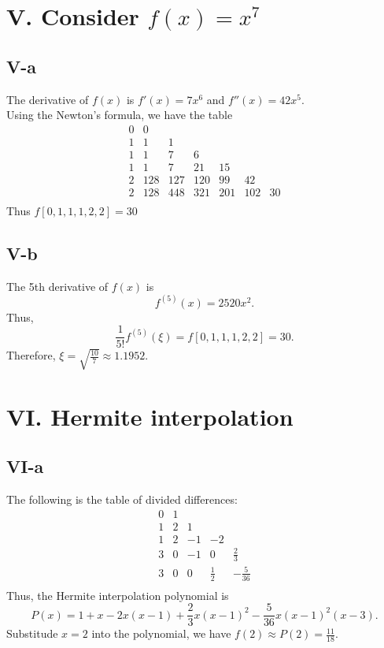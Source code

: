 \documentclass[a4paper]{article}
\begin{document}
\section*{V. Consider $f(x) = x^7$}
\subsection*{V-a}
The derivative of $f(x)$ is $f'(x) = 7x^6$ and $f''(x) = 42x^5$.\\
Using the Newton's formula, we have the table
\[
\begin{array}{c|cccccc}
    0 & 0 &  &  & && \\
    1 & 1 & 1 &  & && \\
    1 & 1 & 7 & 6 &  &&\\
    1 & 1 & 7 & 21 & 15&& \\
    2 & 128 & 127 & 120 & 99 &42&\\
    2 & 128 & 448 & 321 & 201 &102&30\\
\end{array}
\]
Thus $f[0,1,1,1,2,2] = 30$

\subsection*{V-b}
The 5th derivative of $f(x)$ is \[f^{(5)}(x) = 2520x^2.\]
Thus,\[
\frac{1}{5!}f^{(5)}(\xi) = f[0,1,1,1,2,2] = 30.
\]
Therefore, $\xi = \sqrt{\frac{10}{7}} \approx 1.1952$.

\section*{VI. Hermite interpolation}
\subsection*{VI-a}
The following is the table of divided differences:
\[
\begin{array}{c|cccc}
    0 & 1 &  &  &  \\
    1 & 2 & 1 &  &  \\
    1 & 2 & -1 & -2 &  \\
    3 & 0 & -1 & 0 & \frac{2}{3} \\
    3 & 0 & 0 & \frac{1}{2}  & -\frac{5}{36} \\    
\end{array}\]
Thus, the Hermite interpolation polynomial is
\[P(x) = 1 + x - 2x(x-1) + \frac{2}{3}x(x-1)^2 - \frac{5}{36}x(x-1)^2(x-3).\]
Substitude $x = 2$ into the polynomial, we have $f(2) \approx P(2) = \frac{11}{18}$.
\end{document}
